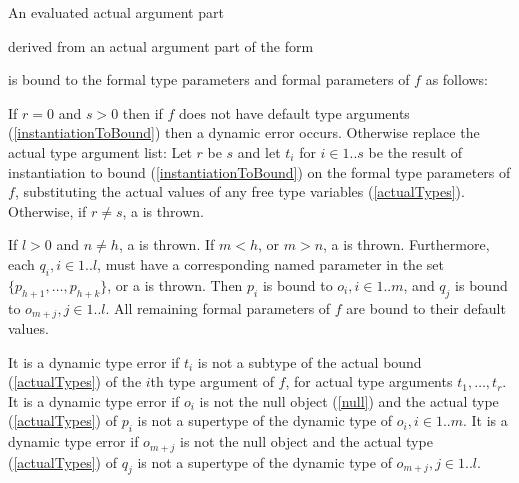 \documentclass[makeidx]{article}
\begin{document}
{\LMHash{}%
An evaluated actual argument part


\noindent
derived from an actual argument part of the form


\noindent
is bound to the formal type parameters and formal parameters of $f$ as follows:

\LMHash{}%
If $r = 0$ and $s > 0$ then
if $f$ does not have default type arguments
(\ref{instantiationToBound})
then a dynamic error occurs.
Otherwise replace the actual type argument list:
Let $r$ be $s$ and let $t_i$ for $i \in 1 .. s$ be the result of
instantiation to bound
(\ref{instantiationToBound})
on the formal type parameters of $f$,
substituting the actual values of any free type variables
(\ref{actualTypes}).
Otherwise, if $r \not= s$, a  is thrown.

\LMHash{}%
If $l > 0$ and $n \not= h$, a  is thrown.
If $m < h$, or $m > n$, a  is thrown.
Furthermore, each
$q_i, i \in 1 .. l$,
must have a corresponding named parameter in the set
$\{p_{h+1}, \ldots, p_{h+k}\}$,
or a  is thrown.
Then $p_i$ is bound to
$o_i, i \in 1 .. m$,
and $q_j$ is bound to $o_{m+j}, j \in 1 .. l$.
All remaining formal parameters of $f$ are bound to their default values.


\LMHash{}%
It is a dynamic type error if $t_i$ is not a subtype of the actual bound
(\ref{actualTypes})
of the $i$th type argument of $f$, for actual type arguments $t_1, \ldots, t_r$.
It is a dynamic type error if $o_i$ is not the null object (\ref{null})
and the actual type
(\ref{actualTypes})
of $p_i$ is not a supertype of the dynamic type of $o_i, i \in 1 .. m$.
It is a dynamic type error if $o_{m+j}$ is
not the null object and the actual type
(\ref{actualTypes})
of $q_j$ is not a supertype of the dynamic type of $o_{m+j}, j \in 1 .. l$.


}
\end{document}
